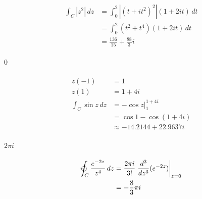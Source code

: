 \documentclass{article}
\begin{document}
\setcounter{subsubsection}{14}
\subsubsection{}

\begin{align*}
  \int_C |z^2| \,d z & = \int_0^2 |(t + i t^2)^2| (1 + 2 i t) \,d t \\
                     & = \int_0^2 (t^2 + t^4) (1 + 2 i t) \,d t     \\
                     & = \frac{136}{15} + \frac{88}{3} i
\end{align*}

\setcounter{subsubsection}{16}
\subsubsection{}

$0$

\setcounter{subsubsection}{18}
\subsubsection{}

\begin{align*}
  z(-1)               & = 1                          \\
  z(1)                & = 1 + 4 i                    \\
  \int_C \sin z \,d z & = -\cos z|_1^{1 + 4 i}       \\
                      & = \cos 1 - \cos (1 + 4 i)    \\
                      & \approx -14.2144 + 22.9637 i
\end{align*}

\setcounter{subsubsection}{20}
\subsubsection{}

$2 \pi i$

\setcounter{subsubsection}{22}
\subsubsection{}

\begin{align*}
  \varointctrclockwise_C \frac{e^{-2 z}}{z^4} \,d z & = \frac{2 \pi i}{3!} \left. \frac{d^3}{d z^3} (e^{-2 z}) \right|_{z = 0} \\
                                                    & = -\frac{8}{3} \pi i
\end{align*}
\end{document}
